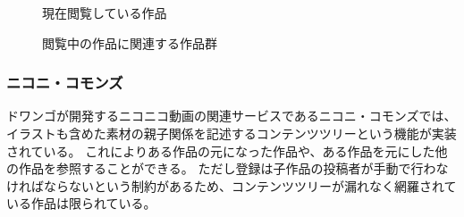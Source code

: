 \begin{figure}[htbp] \begin{minipage}{0.5\hsize}
                         \begin{center} 
                         \end{center} \caption{現在閲覧している作品} \label{fig:pixiv1}
\end{minipage} \begin{minipage}{0.5\hsize}
                   \begin{center} 
                   \end{center} \caption{閲覧中の作品に関連する作品群} \label{fig:pixiv2}
\end{minipage}
\end{figure}

\subsubsection{ニコニ・コモンズ}

ドワンゴが開発するニコニコ動画の関連サービスであるニコニ・コモンズでは、イラストも含めた素材の親子関係を記述するコンテンツツリーという機能が実装されている。
これによりある作品の元になった作品や、ある作品を元にした他の作品を参照することができる。
ただし登録は子作品の投稿者が手動で行わなければならないという制約があるため、コンテンツツリーが漏れなく網羅されている作品は限られている。

